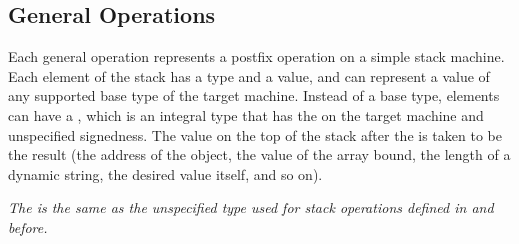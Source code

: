 \subsection{General Operations}
\label{chap:generaloperations}
Each general operation represents a postfix operation on
a simple stack machine. 
Each element of the stack has a type and a value, and can represent
a value of any supported base type of the target machine.  Instead of
a base type, elements can have a 
,
which is an integral type that has the 
 on the target machine and 
unspecified signedness. The value on the top of the stack after 
 the 
is 
taken to be the result (the address of the object, the
value of the array bound, the length of a dynamic string,
the desired value itself, and so on).

\textit{The
\generictype{} is the same as the unspecified type used for stack operations
defined in \DWARFVersionIV{} and before.
}


